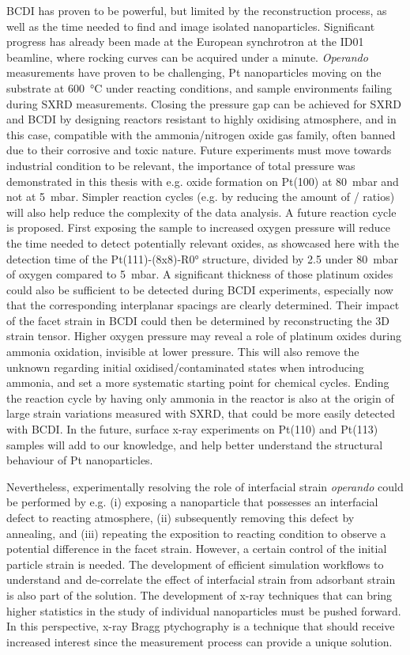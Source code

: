 BCDI has proven to be powerful, but limited by the reconstruction process, as well as the time needed to find and image isolated nanoparticles.
Significant progress has already been made at the European synchrotron at the ID01 beamline, where rocking curves can be acquired under a minute.
\textit{Operando} measurements have proven to be challenging, Pt nanoparticles moving on the substrate at \qty{600}{\degreeCelsius} under reacting conditions, and sample environments failing during SXRD measurements.
Closing the pressure gap can be achieved for SXRD and BCDI by designing reactors resistant to highly oxidising atmosphere, and in this case, compatible with the ammonia/nitrogen oxide gas family, often banned due to their corrosive and toxic nature.
Future experiments must move towards industrial condition to be relevant, the importance of total pressure was demonstrated in this thesis with e.g. oxide formation on Pt(100) at \qty{80}{\milli\bar} and not at \qty{5}{\milli\bar}.
Simpler reaction cycles (e.g. by reducing the amount of / ratios) will also help reduce the complexity of the data analysis.
A future reaction cycle is proposed.
First exposing the sample to increased oxygen pressure will reduce the time needed to detect potentially relevant oxides, as showcased here with the detection time of the Pt(111)-(8x8)-R\ang{0} structure, divided by \num{2.5} under \qty{80}{\milli\bar} of oxygen compared to \qty{5}{\milli\bar}.
A significant thickness of those platinum oxides could also be sufficient to be detected during BCDI experiments, especially now that the corresponding interplanar spacings are clearly determined.
Their impact of the facet strain in BCDI could then be determined by reconstructing the 3D strain tensor.
Higher oxygen pressure may reveal a role of platinum oxides during ammonia oxidation, invisible at lower pressure.
This will also remove the unknown regarding initial oxidised/contaminated states when introducing ammonia, and set a more systematic starting point for chemical cycles.
Ending the reaction cycle by having only ammonia in the reactor is also at the origin of large strain variations measured with SXRD, that could be more easily detected with BCDI.
In the future, surface x-ray experiments on Pt(110) and Pt(113) samples will add to our knowledge, and help better understand the structural behaviour of Pt nanoparticles.

Nevertheless, experimentally resolving the role of interfacial strain \textit{operando} could be performed by e.g. (i) exposing a nanoparticle that possesses an interfacial defect to reacting atmosphere, (ii) subsequently removing this defect by annealing, and (iii) repeating the exposition to reacting condition to observe a potential difference in the facet strain.
However, a certain control of the initial particle strain is needed.
The development of efficient simulation workflows to understand and de-correlate the effect of interfacial strain from adsorbant strain is also part of the solution.
The development of x-ray techniques that can bring higher statistics in the study of individual nanoparticles must be pushed forward.
In this perspective, x-ray Bragg ptychography is a technique that should receive increased interest since the measurement process can provide a unique solution.


